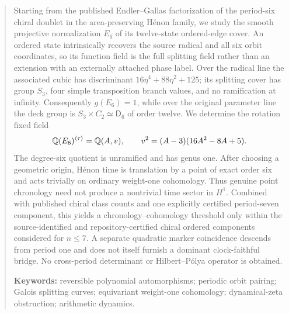 \begin{abstract}
Starting from the published Endler--Gallas factorization of the period-six
chiral doublet in the area-preserving H\'enon family, we study the smooth
projective normalization $E_6$ of its twelve-state ordered-edge cover.  An
ordered state intrinsically recovers the source radical and all six orbit
coordinates, so its function field is the full splitting field rather than
an extension with an externally attached phase label.  Over the radical
line the associated cubic has discriminant
$16\eta^4+88\eta^2+125$; its splitting cover has group $S_3$, four simple
transposition branch values, and no ramification at infinity.  Consequently
$g(E_6)=1$, while over the original parameter line the deck group is
$S_3\times C_2\simeq\mathsf D_6$ of order twelve.  We determine the rotation
fixed field
\[
 \Q(E_6)^{\langle\tau\rangle}=\Q(A,v),\qquad
 v^2=(A-3)(16A^2-8A+5).
\]
The degree-six quotient is unramified and has genus one.  After choosing a
geometric origin, H\'enon time is translation by a point of exact order six
and acts trivially on ordinary weight-one cohomology.  Thus genuine point
chronology need not produce a nontrivial time sector in $H^1$.  Combined with
published chiral class counts and one explicitly certified period-seven
component, this yields a chronology--cohomology threshold only within the
source-identified and repository-certified chiral ordered components
considered for $n\leq7$.  A separate quadratic marker coincidence descends
from period one and does not itself furnish a dominant clock-faithful bridge.
No cross-period determinant or Hilbert--P\'olya operator is obtained.

\medskip
\noindent\textbf{Keywords:} reversible polynomial automorphisms; periodic
orbit pairing; Galois splitting curves; equivariant weight-one cohomology;
dynamical-zeta obstruction; arithmetic dynamics.
\end{abstract}
